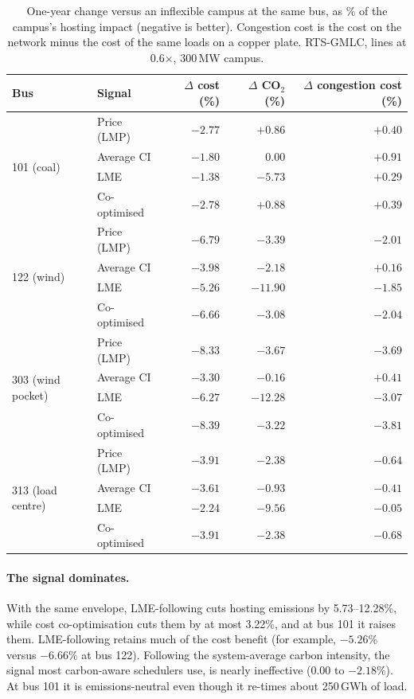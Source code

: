 \documentclass{article} %
\begin{document}
\begin{table}[t]
    \centering
    \caption{One-year change versus an inflexible campus at the same bus, as \% of the campus's hosting impact (negative is better). Congestion cost is the cost on the network minus the cost of the same loads on a copper plate. RTS-GMLC, lines at 0.6$\times$, 300\,MW campus.}
    \label{tab:signals}
    \small
    \begin{tabular}{llrrr}
        \toprule
        Bus & Signal & $\Delta$ cost (\%) & $\Delta$ CO$_2$ (\%) & $\Delta$ congestion cost (\%) \\
        \midrule
        \multirow{4}{*}{101 (coal)} & Price (LMP) & $-2.77$ & $+0.86$ & $+0.40$ \\
         & Average CI & $-1.80$ & $0.00$ & $+0.91$ \\
         & LME & $-1.38$ & $-5.73$ & $+0.29$ \\
         & Co-optimised & $-2.78$ & $+0.88$ & $+0.39$ \\
        \midrule
        \multirow{4}{*}{122 (wind)} & Price (LMP) & $-6.79$ & $-3.39$ & $-2.01$ \\
         & Average CI & $-3.98$ & $-2.18$ & $+0.16$ \\
         & LME & $-5.26$ & $-11.90$ & $-1.85$ \\
         & Co-optimised & $-6.66$ & $-3.08$ & $-2.04$ \\
        \midrule
        \multirow{4}{*}{303 (wind pocket)} & Price (LMP) & $-8.33$ & $-3.67$ & $-3.69$ \\
         & Average CI & $-3.30$ & $-0.16$ & $+0.41$ \\
         & LME & $-6.27$ & $-12.28$ & $-3.07$ \\
         & Co-optimised & $-8.39$ & $-3.22$ & $-3.81$ \\
        \midrule
        \multirow{4}{*}{313 (load centre)} & Price (LMP) & $-3.91$ & $-2.38$ & $-0.64$ \\
         & Average CI & $-3.61$ & $-0.93$ & $-0.41$ \\
         & LME & $-2.24$ & $-9.56$ & $-0.05$ \\
         & Co-optimised & $-3.91$ & $-2.38$ & $-0.68$ \\
        \bottomrule
    \end{tabular}
\end{table}

\paragraph{The signal dominates.} With the same envelope, LME-following cuts hosting emissions by 5.73--12.28\%, while cost co-optimisation cuts them by at most 3.22\%, and at bus 101 it raises them. LME-following retains much of the cost benefit (for example, $-5.26\%$ versus $-6.66\%$ at bus 122). Following the system-average carbon intensity, the signal most carbon-aware schedulers use, is nearly ineffective (0.00 to $-2.18\%$). At bus 101 it is emissions-neutral even though it re-times about 250\,GWh of load.
\end{document}
